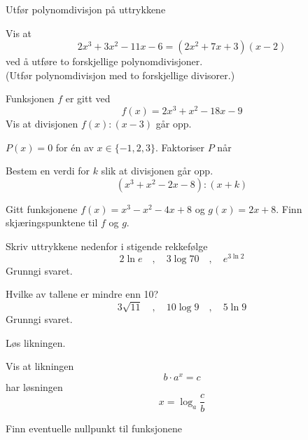 \nes
{}
Utfør polynomdivisjon på uttrykkene \os
{} \os
{}

Vis at
\[ 2x^3+3x^2-11x-6=(2x^2+7x+3)(x-2) \]
ved å utføre to forskjellige polynomdivisjoner. \\(Utfør polynomdivisjon med to forskjellige divisorer.)

Funksjonen $f$ er gitt ved
\[ f(x)=2x^3+x^2-18x-9 \]
Vis at divisjonen $f(x):(x-3)$ går opp.


\newpage

$ P(x)=0 $ for én av $ x\in\{-1, 2, 3\} $.
Faktoriser $ P $ når

Bestem en verdi for $k$ slik at divisjonen går opp.
\[ (x^3+x^2-2x-8):(x+k) \]

Gitt funksjonene $f(x)=x^3-x^2-4x+8$ og $g(x)=2x+8$. Finn skjæringspunktene til $f$ og $g$.


\nes
\nes


Skriv uttrykkene nedenfor i stigende rekkefølge
\[ 2\ln e\quad,\quad3\log 70\quad,\quad e^{3\ln 2} \]
Grunngi svaret.


Hvilke av tallene er mindre enn 10?
\[ 3\sqrt{11}\quad,\quad10\log 9\quad,\quad5\ln 9 \]
Grunngi svaret.

Løs likningen. \os
{}

Vis at likningen
\[ b\cdot a^x =c \]
har løsningen
\[ x=\log_a\frac{c}{b} \]

\newpage
{}
Finn eventuelle nullpunkt til funksjonene \os
{}

